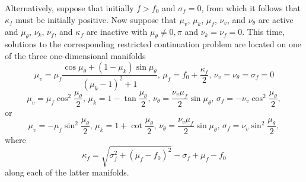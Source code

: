 Alternatively, suppose that initially $f>f_0$ and $\sigma_f=0$, from which it follows that $\kappa_f$ must be initially positive. Now suppose that $\mu_v$, $\mu_k$, $\mu_f$, $\nu_v$, and $\nu_\theta$ are active and $\mu_\theta$, $\nu_k$, $\nu_f$, and $\kappa_f$ are inactive with $\mu_\theta\ne 0,\pi$ and $\nu_k=\nu_f=0$. This time, solutions to the corresponding restricted continuation problem are located on one of the three one-dimensional manifolds
\begin{equation}
\label{Imfld1}
\mu_v=\mu_f\frac{\cos\mu_\theta+(1-\mu_k)\sin\mu_\theta}{(\mu_k-1)^2+1},\,\mu_f=f_0+\frac{\kappa_f}{2},
\,\nu_v=\nu_\theta=\sigma_f=0
\end{equation}
\begin{equation}
\label{Imfld2}
\mu_v=\mu_f\cos^2\frac{\mu_\theta}{2},\,\mu_k=1-\tan\frac{\mu_\theta}{2},\,\nu_\theta=\frac{\nu_v\mu_f}{2}\sin\mu_\theta,\,\sigma_f=-\nu_v\cos^2\frac{\mu_\theta}{2},
\end{equation}
or
\begin{equation}
\label{Imfld3}
\mu_v=-\mu_f\sin^2\frac{\mu_\theta}{2},\,\mu_k=1+\cot\frac{\mu_\theta}{2},\,\nu_\theta=\frac{\nu_v\mu_f}{2}\sin\mu_\theta,\,\sigma_f=\nu_v\sin^2\frac{\mu_\theta}{2},
\end{equation}
where
\begin{equation}
\label{eq:ncf}
\kappa_f=\sqrt{\sigma_f^2+(\mu_f-f_0)^2}-\sigma_f+\mu_f-f_0
\end{equation}
along each of the latter manifolds.

